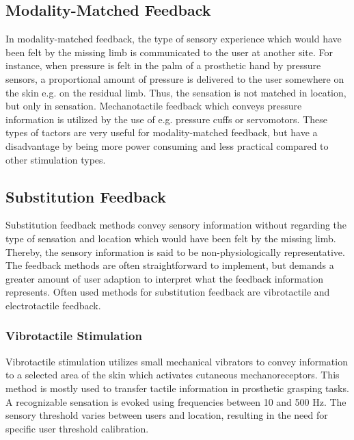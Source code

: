 \subsection{Modality-Matched Feedback}

In modality-matched feedback, the type of sensory experience which would have been felt by the missing limb is communicated to the user at another site. For instance, when pressure is felt in the palm of a prosthetic hand by pressure sensors, a proportional amount of pressure is delivered to the user somewhere on the skin e.g. on the residual limb. Thus, the sensation is not matched in location, but only in sensation. Mechanotactile feedback which conveys pressure information is utilized by the use of e.g. pressure cuffs or servomotors. These types of tactors are very useful for modality-matched feedback, but have a disadvantage by being more power consuming and less practical compared to other stimulation types. \cite{Schofield2014,Antfolk2018} 

\subsection{Substitution Feedback} \label{senssub}

Substitution feedback methods convey sensory information without regarding the type of sensation and location which would have been felt by the missing limb. Thereby, the sensory information is said to be non-physiologically representative. The feedback methods are often straightforward to implement, but demands a greater amount of user adaption to interpret what the feedback information represents. Often used methods for substitution feedback are vibrotactile and electrotactile feedback. \cite{Schofield2014,Antfolk2018}     

\subsubsection{Vibrotactile Stimulation}

Vibrotactile stimulation utilizes small mechanical vibrators to convey information to a selected area of the skin which activates cutaneous mechanoreceptors. This method is mostly used to transfer tactile information in prosthetic grasping tasks. \cite{Schofield2014} A recognizable sensation is evoked using frequencies between 10 and 500 Hz. The sensory threshold varies between users and location, resulting in the need for specific user threshold calibration. \cite{Antfolk2018}  



